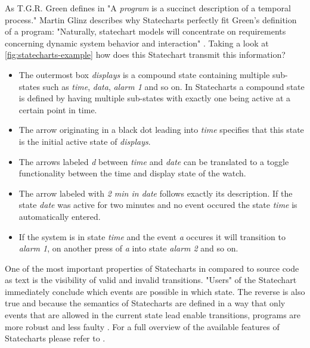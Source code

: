As T.G.R. Green defines in \textcite[3]{green_pictures_1982} "A \emph{program} is a succinct description of a temporal process."
Martin Glinz describes why Statecharts perfectly fit Green's definition of a program: "Naturally, statechart models will concentrate on requirements concerning dynamic system behavior and interaction" \autocite[1]{glinz_statecharts_2002}.
Taking a look at \cref{fig:statecharts-example} how does this Statechart transmit this information?
\begin{itemize}
    \item The outermost box \emph{displays} is a compound state containing multiple sub-states such as \emph{time}, \emph{data}, \emph{alarm 1} and so on. In Statecharts a compound state is defined by having multiple sub-states with exactly one being active at a certain point in time.
    \item The arrow originating in a black dot leading into \emph{time} specifies that this state is the initial active state of \emph{displays}.
    \item The arrows labeled \emph{d} between \emph{time} and \emph{date} can be translated to a toggle functionality between the time and display state of the watch.
    \item The arrow labeled with \emph{2 min in date} follows exactly its description. If the state \emph{date} was active for two minutes and no event occured the state \emph{time} is automatically entered.
    \item If the system is in state \emph{time} and the event \emph{a} occures it will transition to \emph{alarm 1}, on another press of \emph{a} into state \emph{alarm 2} and so on.
\end{itemize}

One of the most important properties of Statecharts in compared to source code as text is the visibility of valid and invalid transitions.
"Users" of the Statechart immediately conclude which events are possible in which state.
The reverse is also true and because the semantics of Statecharts are defined in a way that only events that are allowed in the current state lead enable transitions, programs are more robust and less faulty \autocite{horrocks_constructing_1999}.
For a full overview of the available features of Statecharts please refer to \textcite{harel_statecharts:_1987}.

